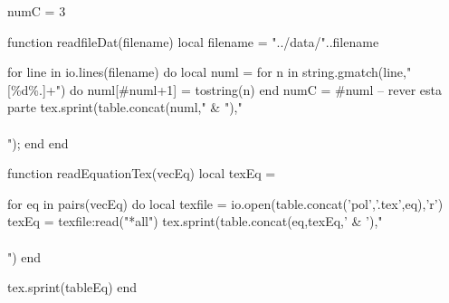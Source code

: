 

\begin{luacode}
  numC = 3

  function readfileDat(filename)
    local filename = "../data/"..filename

    for line in io.lines(filename) do
        local numl = {}
        for n in string.gmatch(line,"[\%d\%.]+") do
          numl[#numl+1] = tostring(n)
        end
        numC = #numl -- rever esta parte
        tex.sprint(table.concat(numl," & ")," \\\\");
    end
  end
\end{luacode}

\newcommand{\luaTable}[4][\directlua{tex.print(numC)}]
{
  \begin{table}[H]
  \centering
  \caption{#3}
  \begin{tabular}{*{#1}{c}}
  \hline
  #4\\
  \hline
  \directlua{readfileDat('#2')}
  \hline
  \end{tabular}
  \end{table}
}


\begin{luacode}
  function readEquationTex(vecEq)
    local texEq = {}

    for eq in pairs(vecEq) do
      local texfile = io.open(table.concat({'pol','.tex'},eq),'r')
      texEq = texfile:read("*all")
      tex.sprint(table.concat({eq,texEq},' & ')," \\\\")
    end

    tex.sprint(tableEq)
  end
\end{luacode}

\newcommand{\polyTable}[3][tbPoly]
{
  \begin{table}[H]
    \label{#1}
    \centering
    \caption{#3}
    \begin{tabular}{*{2}{c}}
      \hline
      $i$ & $f_i(x)$\\
      \hline
      \directlua{readEquationTex({#2})}
      \hline
    \end{tabular}
  \end{table}
}


